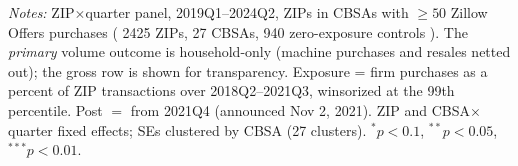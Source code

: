 \begin{table}[!htbp]\centering
\caption{The Zillow Offers shutdown: difference-in-differences}
\label{tab:T3}
\begin{minipage}{0.92\linewidth}\footnotesize\vspace{2pt}
\emph{Notes:} ZIP$\times$quarter panel, 2019Q1--2024Q2, ZIPs in CBSAs with
$\geq 50$ Zillow Offers purchases (
2425 ZIPs, 27 CBSAs, 940 zero-exposure controls
). The \emph{primary} volume outcome is household-only (machine purchases
and resales netted out); the gross row is shown for transparency. Exposure
= firm purchases as a percent of ZIP transactions over 2018Q2--2021Q3,
winsorized at the 99th percentile. Post $=$ from 2021Q4 (announced Nov 2,
2021). ZIP and CBSA$\times$quarter fixed effects; SEs clustered by CBSA (27
clusters). $^{*}p<0.1$, $^{**}p<0.05$, $^{***}p<0.01$.
\end{minipage}
\end{table}
